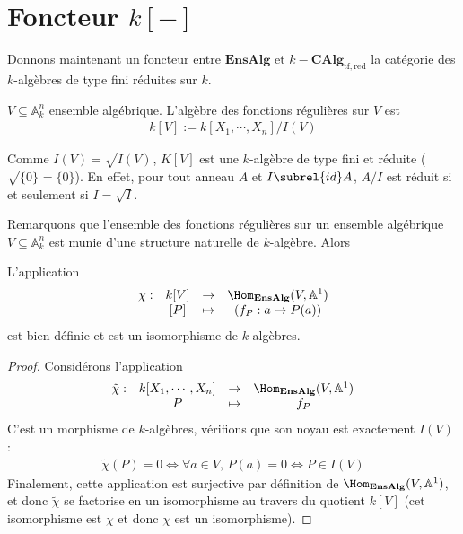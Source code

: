     \section{Foncteur $k[-]$}
        Donnons maintenant un foncteur entre $\mathbf{EnsAlg}$ et $k-\mathbf{CAlg}_\mathrm{tf, red}$ la catégorie des $k$-algèbres de type fini réduites sur $k$.
        \begin{defi}
            $V \subseteq \mathbb{A}_k^n$ ensemble algébrique. L'algèbre des fonctions régulières sur $V$ est
            \begin{align*}
                k[V] := k[X_1, \cdots, X_n]/I(V)
            \end{align*}
        \end{defi}
        \begin{remq}
            Comme $I(V) = \sqrt{I(V)}$, $K[V]$ est une $k$-algèbre de type fini et réduite ($\sqrt{\{0\}} = \{0\}$). En effet, pour tout anneau $A$ et $I \subrel{id} A$, $A/I$ est réduit si et seulement si $I = \sqrt{I}$.
        \end{remq}
        Remarquons que l'ensemble des fonctions régulières sur un ensemble algébrique $V \subseteq \mathbb{A}_k^n$ est munie d'une structure naturelle de $k$-algèbre. Alors
        \begin{lemm}
            L'application
            \begin{align*}
                \begin{array}{cccc}
                    \chi : & k[V] & \to & \Hom_{\mathbf{EnsAlg}}(V, \mathbb{A}^1) \\
                    & [P] & \mapsto & (f_P : a \mapsto P(a))\\
                \end{array}
            \end{align*}
            est bien définie et est un isomorphisme de $k$-algèbres.
        \end{lemm}
        \begin{proof}
            Considérons l'application
            \begin{align*}
                \begin{array}{cccc}
                    \tilde \chi : & k[X_1, \cdots, X_n] & \to & \Hom_{\mathbf{EnsAlg}}(V, \mathbb{A}^1) \\
                    & P & \mapsto & f_P\\
                \end{array}
            \end{align*}
            C'est un morphisme de $k$-algèbres, vérifions que son noyau est exactement $I(V)$ : \begin{align*}
                \tilde \chi (P) = 0 \iff \forall a \in V,\, P(a) = 0 \iff P \in I(V)
            \end{align*}
            Finalement, cette application est surjective par définition de $\Hom_{\mathbf{EnsAlg}}(V, \mathbb{A}^1)$, et donc $\tilde \chi$ se factorise en un isomorphisme au travers du quotient $k[V]$ (cet isomorphisme est $\chi$ et donc $\chi$ est un isomorphisme).
        \end{proof}
